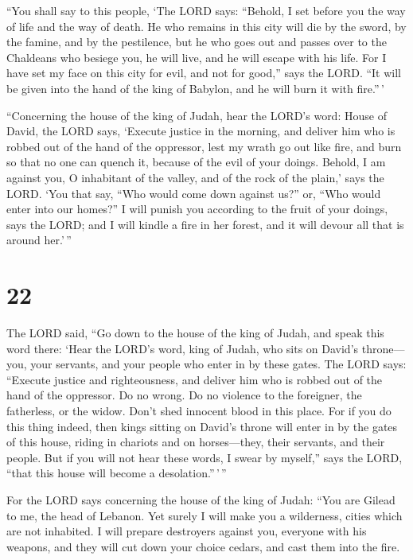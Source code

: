  ``You shall say to this people, `The LORD says: ``Behold, I
set before you the way of life and the way of death.  He who
remains in this city will die by the sword, by the famine, and by the
pestilence, but he who goes out and passes over to the Chaldeans who
besiege you, he will live, and he will escape with his life.
 For I have set my face on this city for evil, and not for
good,'' says the LORD. ``It will be given into the hand of the king of
Babylon, and he will burn it with fire.''\,'

 ``Concerning the house of the king of Judah, hear the
LORD's word:  House of David, the LORD says, `Execute
justice in the morning, and deliver him who is robbed out of the hand of
the oppressor, lest my wrath go out like fire, and burn so that no one
can quench it, because of the evil of your doings.  Behold,
I am against you, O inhabitant of the valley, and of the rock of the
plain,' says the LORD. `You that say, ``Who would come down against
us?'' or, ``Who would enter into our homes?''  I will
punish you according to the fruit of your doings, says the LORD; and I
will kindle a fire in her forest, and it will devour all that is around
her.'\,''

\hypertarget{section-21}{%
\section{22}\label{section-21}}

 The LORD said, ``Go down to the house of the king of Judah,
and speak this word there:  `Hear the LORD's word, king of
Judah, who sits on David's throne---you, your servants, and your people
who enter in by these gates.  The LORD says: ``Execute
justice and righteousness, and deliver him who is robbed out of the hand
of the oppressor. Do no wrong. Do no violence to the foreigner, the
fatherless, or the widow. Don't shed innocent blood in this place.
 For if you do this thing indeed, then kings sitting on
David's throne will enter in by the gates of this house, riding in
chariots and on horses---they, their servants, and their people.
 But if you will not hear these words, I swear by myself,''
says the LORD, ``that this house will become a desolation.''\,'\,''

 For the LORD says concerning the house of the king of
Judah: ``You are Gilead to me, the head of Lebanon. Yet surely I will
make you a wilderness, cities which are not inhabited.  I
will prepare destroyers against you, everyone with his weapons, and they
will cut down your choice cedars, and cast them into the fire.


